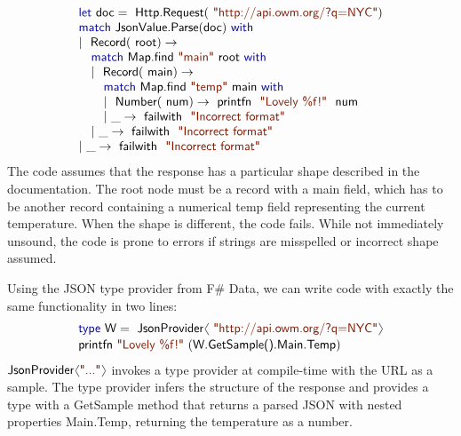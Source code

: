 \documentclass[10pt]{sigplanconf}
\newcommand{\langl}{\begin{picture}(4.5,7)
\put(1.1,2.5){\rotatebox{60}{\line(1,0){5.5}}}
\put(1.1,2.5){\rotatebox{300}{\line(1,0){5.5}}}
\end{picture}}
\newcommand{\rangl}{\begin{picture}(4.5,7)
\put(.9,2.5){\rotatebox{120}{\line(1,0){5.5}}}
\put(.9,2.5){\rotatebox{240}{\line(1,0){5.5}}}
\end{picture}}
\newcommand{\kvd}[1]{\textnormal{\textcolor{kvdclr}{\sffamily #1}}}
\newcommand{\str}[1]{\textnormal{\textcolor{strclr}{\sffamily "#1"}}}
\newcommand{\strf}[1]{\textnormal{\textcolor{strclr}{\sffamily #1}}}
\newcommand{\ident}[1]{\textnormal{\sffamily #1}}
\begin{document}
\noindent
\begin{equation*}
\begin{array}{l}
 \kvd{let}~\ident{doc}=\ident{Http.Request}(\str{http://api.owm.org/?q=NYC}) \\
 \kvd{match}~\ident{JsonValue.Parse}(\ident{doc})~\kvd{with} \\
 |~\ident{Record}(\ident{root})\rightarrow \\
 \quad \kvd{match}~\ident{Map.find}~\str{main}~\ident{root}~\kvd{with} \\
 \quad |~\ident{Record}(\ident{main})\rightarrow \\
 \quad \quad \kvd{match}~\ident{Map.find}~\str{temp}~\ident{main}~\kvd{with} \\
 \quad \quad |~\ident{Number}(\ident{num})\rightarrow \ident{printfn}~\str{Lovely \%f!}~\ident{num} \\
 \quad \quad |~\_\rightarrow \ident{failwith}~\str{Incorrect format} \\
 \quad |~\_\rightarrow \ident{failwith}~\str{Incorrect format} \\
 |~\_\rightarrow \ident{failwith}~\str{Incorrect format}
\end{array}
\end{equation*}
%
The code assumes that the response has a particular shape described in the documentation. The
root node must be a record with a \strf{main} field, which has to be another record containing
a numerical \strf{temp} field representing the current temperature. When the shape is different,
the code fails. While not immediately unsound, the code is prone to errors if strings are
misspelled or incorrect shape assumed.

Using the JSON type provider from F\# Data, we can write code with exactly the
same functionality in two lines:
%
\vspace{-0.1em}
\begin{equation*}
\begin{array}{l}
 \kvd{type}~\ident{W} = \ident{JsonProvider}\langl\str{http://api.owm.org/?q=NYC}\rangl \\[0.1em]
 \ident{printfn}~\str{Lovely \%f!}~(\ident{W.GetSample().Main.Temp})
\end{array}
\end{equation*}
%
$\ident{JsonProvider}\langl\str{...}\rangl$ invokes a type provider \cite{fsharp-typeprov} at
compile-time with the URL as a sample. The type provider infers the structure of the response
and provides a type with a \ident{GetSample} method that returns a parsed JSON with nested
properties \ident{Main.Temp}, returning the temperature as a number.
\end{document}
